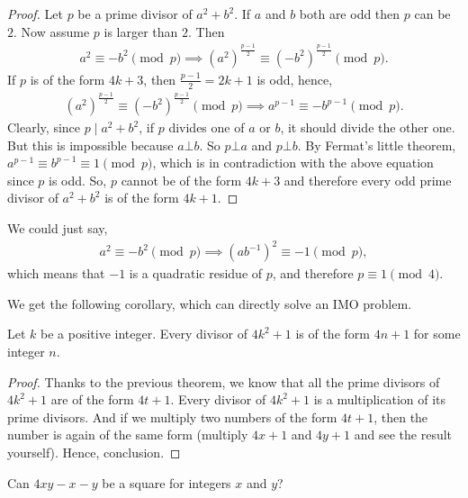 \documentclass[main.tex]{subfile}
\begin{document}
	\begin{proof}
		Let $p$ be a prime divisor of $a^2+b^2$. If $a$ and $b$ both are odd then $p$ can be $2$. Now assume $p$ is larger than $2$. Then
			\begin{align*}
				a^2  \equiv-b^2 \pmod p\implies \left(a^2\right)^{\frac{p-1}{2}} \equiv \left(-b^2\right)^{\frac{p-1}{2}}\pmod p.
			\end{align*}
		If $p$ is of the form $4k+3$, then $\frac{p-1}{2}=2k+1$ is odd, hence,
			\begin{align*}
			\left(a^2\right)^{\frac{p-1}{2}} \equiv \left(-b^2\right)^{\frac{p-1}{2}}\pmod p \implies a^{p-1} \equiv -b^{p-1} \pmod p.
			\end{align*}
		Clearly, since $p\mid a^2+b^2$, if $p$ divides one of $a$ or $b$, it should divide the other one. But this is impossible because $a \bot b$. So $p \bot a$ and $p \bot b$. By Fermat's little theorem, $a^{p-1} \equiv b^{p-1} \equiv 1 \pmod p$, which is in contradiction with the above equation since $p$ is odd.
		So, $p$ cannot be of the form $4k+3$ and therefore every odd prime divisor of $a^2+b^2$ is of the form $4k+1$.
	\end{proof}

	\begin{note}
	We could just say,
			\begin{align*}
				a^2  \equiv-b^2\pmod p \implies (ab^{-1})^2 \equiv-1\pmod p,
			\end{align*}
		which means that $-1$ is a quadratic residue of $p$, and therefore $p\equiv1\pmod4$.
	\end{note}
We get the following corollary, which can directly solve an IMO problem.
	\begin{corollary}\label{cor:4n+1}
		Let $k$ be a positive integer. Every divisor of $4k^2+1$ is of the form $4n+1$ for some integer $n$.
	\end{corollary}

	\begin{proof}
		Thanks to the previous theorem, we know that all the prime divisors of $4k^2+1$ are of the form $4t+1$. Every divisor of $4k^2+1$ is a multiplication of its prime divisors. And if we multiply two numbers of the form $4t+1$, then the number is again of the same form (multiply $4x+1$ and $4y+1$ and see the result yourself). Hence, conclusion.
	\end{proof}

	\begin{problem}
		Can $4xy-x-y$ be a square for integers $x$ and $y$?
	\end{problem}
\end{document}
